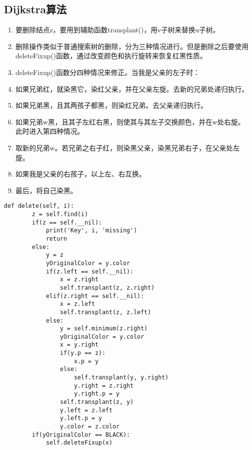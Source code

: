 \documentclass[12pt,letterpaper]{article}
\begin{document}
\subsection{Dijkstra算法}
\begin{enumerate}
	\item 要删除结点z，要用到辅助函数transplant()，用v子树来替换u子树。
	\item 删除操作类似于普通搜索树的删除，分为三种情况进行。但是删除之后要使用deleteFixup()函数，通过改变颜色和执行旋转来恢复红黑性质。
	\item deleteFixup()函数分四种情况来修正。当我是父亲的左子时：
	\item 如果兄弟红，就染黑它，染红父亲，并在父亲左旋。去新的兄弟处递归执行。
	\item 如果兄弟黑，且其两孩子都黑，则染红兄弟。去父亲递归执行。
	\item 如果兄弟w黑，且其子左红右黑，则使其与其左子交换颜色，并在w处右旋。此时进入第四种情况。
	\item 取新的兄弟w。若兄弟之右子红，则染黑父亲，染黑兄弟右子，在父亲处左旋。
	\item 如果我是父亲的右孩子，以上左、右互换。
	\item 最后，将自己染黑。
\end{enumerate}
\begin{lstlisting}[style = Python]
    def delete(self, i):
        z = self.find(i)
        if(z == self.__nil):
            print('Key', i, 'missing')
            return
        else:
            y = z
            yOriginalColor = y.color
            if(z.left == self.__nil):
                x = z.right
                self.transplant(z, z.right)
            elif(z.right == self.__nil):
                x = z.left
                self.transplant(z, z.left)
            else:
                y = self.minimum(z.right)
                yOriginalColor = y.color
                x = y.right
                if(y.p == z):
                    x.p = y
                else:
                    self.transplant(y, y.right)
                    y.right = z.right
                    y.right.p = y
                self.transplant(z, y)
                y.left = z.left
                y.left.p = y
                y.color = z.color
        if(yOriginalColor == BLACK):
            self.deleteFixup(x) 
\end{lstlisting}
\end{document}
